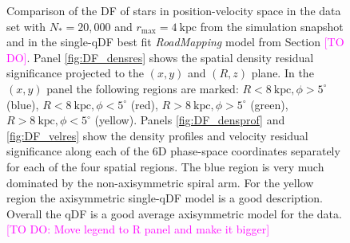 \documentclass[iop,revtex4,numberedappendix,appendixfloats]{emulateapj}
\newcommand{\RM}{{\sl RoadMapping}}
\newcommand{\Wilma}[1]{\textcolor{Magenta}{#1}}
\begin{document}
\begin{figure}[!htbp]
  \centering
  \caption{Comparison of the DF of stars in position-velocity space in the data set with $N_*=20,000$ and $r_\text{max}=4~\text{kpc}$ from the simulation snapshot and in the single-qDF best fit \RM{} model from Section \Wilma{[TO DO]}. Panel \ref{fig:DF_densres} shows the spatial density residual significance projected to the $(x,y)$ and $(R,z)$ plane. In the $(x,y)$ panel the following regions are marked: $R<8~\text{kpc},\phi>5^\circ$ (blue), $R<8~\text{kpc},\phi<5^\circ$ (red), $R>8~\text{kpc},\phi>5^\circ$ (green), $R>8~\text{kpc},\phi<5^\circ$ (yellow). Panels \ref{fig:DF_densprof} and \ref{fig:DF_velres} show the density profiles and velocity residual significance along each of the 6D phase-space coordinates separately for each of the four spatial regions. The blue region is very much dominated by the non-axisymmetric spiral arm. For the yellow region the axisymmetric single-qDF model is a good description. Overall the qDF is a good average axisymmetric model for the data. \Wilma{[TO DO: Move legend to R panel and make it bigger]}}
  \label{fig:4kpc8Spiral_DF_comparison}
\end{figure}
\end{document}
